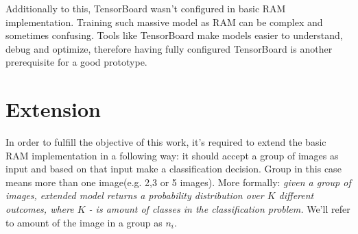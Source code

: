 {Additionally to this, TensorBoard wasn't configured in basic RAM implementation.
Training such massive model as RAM can be complex and sometimes confusing.
Tools like TensorBoard make models easier to understand, debug
and optimize, therefore having fully configured TensorBoard is another
prerequisite for a good prototype.























%
%
%


\section{Extension}
\label{sec:extension}
In order to fulfill the objective of this work, it's required to extend the basic
RAM implementation in a following way: it should accept a group of images as input
and based on that input make a classification decision. Group in this case means
more than one image(e.g. 2,3 or 5 images). More formally:
\textit{given a group of images, extended model returns a probability distribution over
$K$ different outcomes, where $K$ - is amount of classes in the classification problem.}
We'll refer to amount of the image in a group as $n_i$.

}
